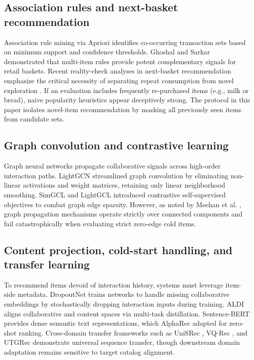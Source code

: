 \documentclass[10pt,a4paper]{article}
\begin{document}
\subsection{Association rules and next-basket recommendation}

Association rule mining via Apriori \cite{agrawal1994_apriori} identifies co-occurring transaction sets based on minimum support and confidence thresholds. Ghoshal and Sarkar \cite{ghoshal2014_multi_item_rules} demonstrated that multi-item rules provide potent complementary signals for retail baskets. Recent reality-check analyses in next-basket recommendation emphasize the critical necessity of separating repeat consumption from novel exploration \cite{li2023_nbr_reality, li2023_repetition_exploration, li2023_mask_swap, mansouri2026_repeat_explore_lightgcn}. If an evaluation includes frequently re-purchased items (e.g., milk or bread), naive popularity heuristics appear deceptively strong. The protocol in this paper isolates novel-item recommendation by masking all previously seen items from candidate sets.

\subsection{Graph convolution and contrastive learning}

Graph neural networks propagate collaborative signals across high-order interaction paths. LightGCN \cite{he2020_lightgcn} streamlined graph convolution by eliminating non-linear activations and weight matrices, retaining only linear neighborhood smoothing. SimGCL \cite{yu2022_simgcl} and LightGCL \cite{cai2023_lightgcl} introduced contrastive self-supervised objectives to combat graph edge sparsity. However, as noted by Meehan et al. \cite{meehan2025_cold_popbias, meehan2026_semco}, graph propagation mechanisms operate strictly over connected components and fail catastrophically when evaluating strict zero-edge cold items.

\subsection{Content projection, cold-start handling, and transfer learning}

To recommend items devoid of interaction history, systems must leverage item-side metadata. DropoutNet \cite{volkovs2017_dropoutnet} trains networks to handle missing collaborative embeddings by stochastically dropping interaction inputs during training. ALDI \cite{huang2023_aldi} aligns collaborative and content spaces via multi-task distillation. Sentence-BERT \cite{reimers2019_sbert} provides dense semantic text representations, which AlphaRec \cite{sheng2025_alpharec} adapted for zero-shot ranking. Cross-domain transfer frameworks such as UniSRec \cite{hou2022_unisrec}, VQ-Rec \cite{hou2023_vqrec}, and UTGRec \cite{zheng2026_utgrec} demonstrate universal sequence transfer, though downstream domain adaptation remains sensitive to target catalog alignment.
\end{document}
